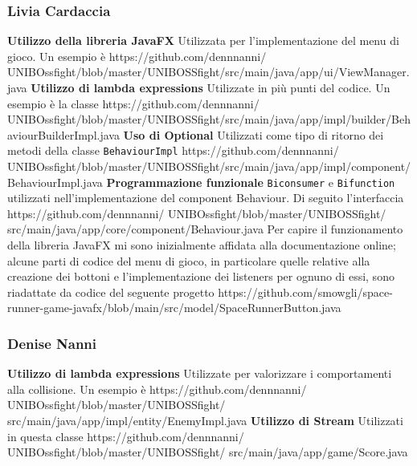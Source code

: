 \documentclass{article}
\begin{document}
\subsubsection{Livia Cardaccia}
\small
\textbf{Utilizzo della libreria JavaFX}
\newline
Utilizzata per l'implementazione del menu di gioco. Un esempio è https://github.com/dennnanni/
UNIBOssfight/blob/master/UNIBOSSfight/src/main/java/app/ui/ViewManager.java
\newline
\textbf{Utilizzo di lambda expressions}
\newline
Utilizzate in più punti del codice. Un esempio è la classe https://github.com/dennnanni/
UNIBOssfight/blob/master/UNIBOSSfight/src/main/java/app/impl/builder/BehaviourBuilderImpl.java
\newline 
\textbf{Uso di Optional}
\newline
Utilizzati come tipo di ritorno dei metodi della classe \texttt{BehaviourImpl} https://github.com/dennnanni/
UNIBOssfight/blob/master/UNIBOSSfight/src/main/java/app/impl/component/BehaviourImpl.java
\newline
\textbf{Programmazione funzionale}
\newline
\texttt{Biconsumer} e \texttt{Bifunction} utilizzati nell'implementazione del component Behaviour. Di seguito l'interfaccia https://github.com/dennnanni/
UNIBOssfight/blob/master/UNIBOSSfight/
src/main/java/app/core/component/Behaviour.java
\newline 
\newline
\large
Per capire il funzionamento della libreria JavaFX mi sono inizialmente affidata alla documentazione online; alcune parti di codice del menu di gioco, in particolare quelle relative alla creazione dei bottoni e l'implementazione dei listeners per ognuno di essi, sono riadattate da codice del seguente progetto https://github.com/smowgli/space-runner-game-javafx/blob/main/src/model/SpaceRunnerButton.java
\subsubsection{Denise Nanni}
\small
\textbf{Utilizzo di lambda expressions}
\newline
Utilizzate per valorizzare i comportamenti alla collisione. Un esempio è https://github.com/dennnanni/
UNIBOssfight/blob/master/UNIBOSSfight/
src/main/java/app/impl/entity/EnemyImpl.java
\newline
\textbf{Utilizzo di Stream}
\newline
Utilizzati in questa classe https://github.com/dennnanni/
UNIBOssfight/blob/master/UNIBOSSfight/
src/main/java/app/game/Score.java
\end{document}
